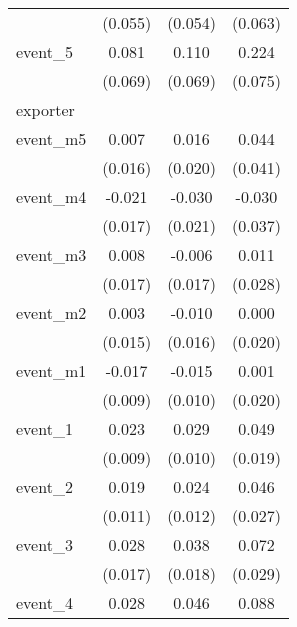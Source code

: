 {\begin{tabular}{l*{3}{c}}
            &     (0.055)         &     (0.054)         &     (0.063)         \\
[1em]
event\_5     &       0.081         &       0.110         &       0.224\sym{**} \\
            &     (0.069)         &     (0.069)         &     (0.075)         \\
\hline
exporter    &                     &                     &                     \\
event\_m5    &       0.007         &       0.016         &       0.044         \\
            &     (0.016)         &     (0.020)         &     (0.041)         \\
[1em]
event\_m4    &      -0.021         &      -0.030         &      -0.030         \\
            &     (0.017)         &     (0.021)         &     (0.037)         \\
[1em]
event\_m3    &       0.008         &      -0.006         &       0.011         \\
            &     (0.017)         &     (0.017)         &     (0.028)         \\
[1em]
event\_m2    &       0.003         &      -0.010         &       0.000         \\
            &     (0.015)         &     (0.016)         &     (0.020)         \\
[1em]
event\_m1    &      -0.017         &      -0.015         &       0.001         \\
            &     (0.009)         &     (0.010)         &     (0.020)         \\
[1em]
event\_1     &       0.023\sym{**} &       0.029\sym{**} &       0.049\sym{*}  \\
            &     (0.009)         &     (0.010)         &     (0.019)         \\
[1em]
event\_2     &       0.019         &       0.024\sym{*}  &       0.046         \\
            &     (0.011)         &     (0.012)         &     (0.027)         \\
[1em]
event\_3     &       0.028         &       0.038\sym{*}  &       0.072\sym{*}  \\
            &     (0.017)         &     (0.018)         &     (0.029)         \\
[1em]
event\_4     &       0.028         &       0.046\sym{**} &       0.088\sym{**} \\

\end{tabular}}
